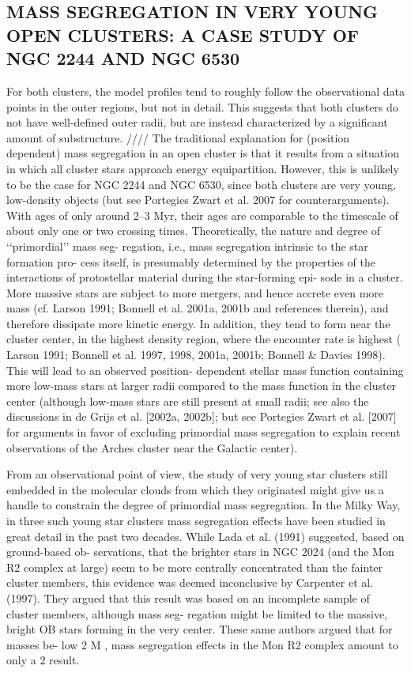 \documentclass[../Main.tex]{subfiles}
\begin{document}
{\subsection{MASS SEGREGATION IN VERY YOUNG OPEN CLUSTERS:
A CASE STUDY OF NGC 2244 AND NGC 6530}
For both clusters, the model profiles tend to roughly follow the
observational data points in the outer regions, but not in detail. This
suggests that both clusters do not have well-defined outer radii, but
are instead characterized by a significant amount of substructure.
////
The traditional explanation for (position dependent) mass
segregation in an open cluster is that it results from a situation in
which all cluster stars approach energy equipartition. However,
this is unlikely to be the case for NGC 2244 and NGC 6530, since
both clusters are very young, low-density objects (but see Portegies
Zwart et al. 2007 for counterarguments). With ages of only around
2–3 Myr, their ages are comparable to the timescale of about only
one or two crossing times.
Theoretically, the nature and degree of ‘‘primordial’’ mass seg-
regation, i.e., mass segregation intrinsic to the star formation pro-
cess itself, is presumably determined by the properties of the
interactions of protostellar material during the star-forming epi-
sode in a cluster. More massive stars are subject to more mergers,
and hence accrete even more mass (cf. Larson 1991; Bonnell
et al. 2001a, 2001b and references therein), and therefore dissipate
more kinetic energy. In addition, they tend to form near the cluster
center, in the highest density region, where the encounter rate is
highest ( Larson 1991; Bonnell et al. 1997, 1998, 2001a, 2001b;
Bonnell & Davies 1998). This will lead to an observed position-
dependent stellar mass function containing more low-mass stars at larger radii compared to the mass function in the cluster center
(although low-mass stars are still present at small radii; see also
the discussions in de Grijs et al. [2002a, 2002b]; but see Portegies
Zwart et al. [2007] for arguments in favor of excluding primordial
mass segregation to explain recent observations of the Arches
cluster near the Galactic center).

From an observational point of view, the study of very young
star clusters still embedded in the molecular clouds from which
they originated might give us a handle to constrain the degree of
primordial mass segregation. In the Milky Way, in three such
young star clusters mass segregation effects have been studied in
great detail in the past two decades.
While Lada et al. (1991) suggested, based on ground-based ob-
servations, that the brighter stars in NGC 2024 (and the Mon R2
complex at large) seem to be more centrally concentrated than the
fainter cluster members, this evidence was deemed inconclusive
by Carpenter et al. (1997). They argued that this result was based
on an incomplete sample of cluster members, although mass seg-
regation might be limited to the massive, bright OB stars forming
in the very center. These same authors argued that for masses be-
low 2 M , mass segregation effects in the Mon R2 complex amount
to only a 2 result.

}
\end{document}
